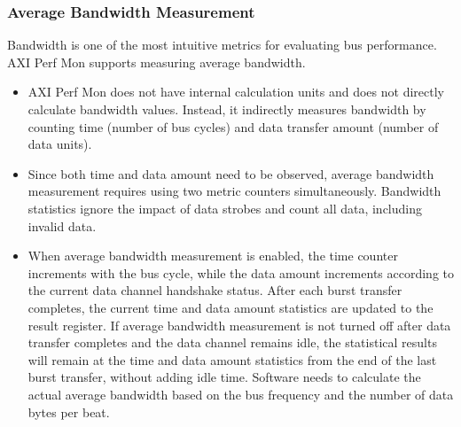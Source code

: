 \documentclass[main\_\_EN.tex]{subfiles}
\begin{document}
\subsubsection{Average Bandwidth Measurement}
Bandwidth is one of the most intuitive metrics for evaluating bus performance. AXI Perf Mon supports measuring average bandwidth.
\begin{itemize}
    \item AXI Perf Mon does not have internal calculation units and does not directly calculate bandwidth values. Instead, it indirectly measures bandwidth by counting time (number of bus cycles) and data transfer amount (number of data units).
    \item Since both time and data amount need to be observed, average bandwidth measurement requires using two metric counters simultaneously. Bandwidth statistics ignore the impact of data strobes and count all data, including invalid data.
    \item When average bandwidth measurement is enabled, the time counter increments with the bus cycle, while the data amount increments according to the current data channel handshake status. After each burst transfer completes, the current time and data amount statistics are updated to the result register. If average bandwidth measurement is not turned off after data transfer completes and the data channel remains idle, the statistical results will remain at the time and data amount statistics from the end of the last burst transfer, without adding idle time. Software needs to calculate the actual average bandwidth based on the bus frequency and the number of data bytes per beat.
\end{itemize}
\end{document}
